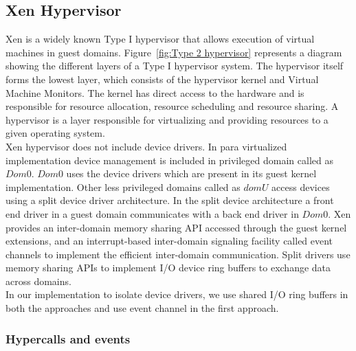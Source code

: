\subsection{Xen Hypervisor}

Xen\cite{Barham:2003:XAV:1165389.945462} is a widely known Type I hypervisor that allows execution of virtual machines in guest domains\cite{King_operatingsystem}. Figure~\ref{fig:Type 2 hypervisor} represents a diagram showing the different layers of a Type I hypervisor system. The hypervisor itself forms the lowest layer, which consists of the hypervisor kernel and Virtual Machine Monitors. The kernel has direct access to the hardware and is responsible for resource allocation, resource scheduling and resource sharing. A hypervisor is a layer responsible for virtualizing and providing resources to a given operating system.
\\
Xen hypervisor does not include device drivers. In para virtualized implementation device management is included in privileged domain called as $Dom 0$. $Dom 0$ uses the device drivers which are present in its guest kernel implementation. Other less privileged domains called as $dom U$ access devices using a split device driver architecture. In the split device architecture a front end driver in a guest domain communicates with a back end driver in $Dom 0$. Xen provides an inter-domain memory sharing API accessed through the guest kernel extensions, and an interrupt-based inter-domain signaling facility called event channels to implement the efficient inter-domain communication. Split drivers use memory sharing APIs to implement I/O device ring buffers to exchange data across domains.
\\
In our implementation to isolate device drivers, we use shared I/O ring buffers in both the approaches and use event channel in the first approach.\cite{Barham:2003:XAV:1165389.945462}\cite{Nikolaev:2013:VOS:2517349.2522719}\cite{Ruslan}

\subsubsection{Hypercalls and events}

